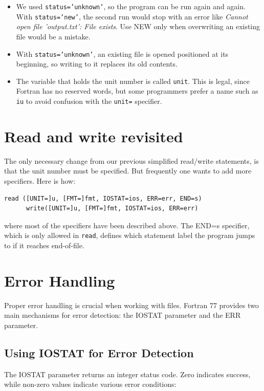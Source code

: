 \begin{itemize}
    \item We used \texttt{status='unknown'}, so the program can be run again and again. With \texttt{status='new'}, the second run would stop with an error like \emph{Cannot open file 'output.txt': File exists}. Use NEW only when overwriting an existing file would be a mistake.
    \item With \texttt{status='unknown'}, an existing file is opened positioned at its beginning, so writing to it replaces its old contents.
    \item The variable that holds the unit number is called \texttt{unit}. This is legal, since Fortran has no reserved words, but some programmers prefer a name such as \texttt{iu} to avoid confusion with the \texttt{unit=} specifier.
\end{itemize}

\section{Read and write revisited}

The only necessary change from our previous simplified read/write statements, is that the unit number must be specified. But frequently one wants to add more specifiers. Here is how:

\begin{lstlisting}[style=fortran77]
      read ([UNIT=]u, [FMT=]fmt, IOSTAT=ios, ERR=err, END=s)
      write([UNIT=]u, [FMT=]fmt, IOSTAT=ios, ERR=err)
\end{lstlisting}

where most of the specifiers have been described above. The END=s specifier, which is only allowed in \texttt{read}, defines which statement label the program jumps to if it reaches end-of-file.

\section{Error Handling}

Proper error handling is crucial when working with files. Fortran 77 provides two main mechanisms for error detection: the IOSTAT parameter and the ERR parameter.

\subsection{Using IOSTAT for Error Detection}

The IOSTAT parameter returns an integer status code. Zero indicates success, while non-zero values indicate various error conditions:

